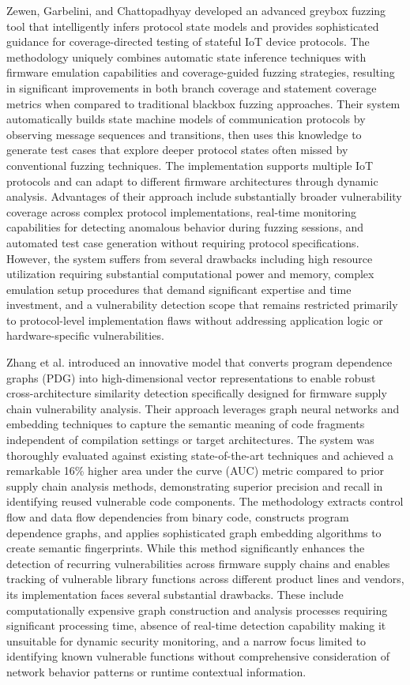 Zewen, Garbelini, and Chattopadhyay \cite{zewen2024ufuzz} developed an advanced greybox fuzzing tool that intelligently infers protocol state models and provides sophisticated guidance for coverage-directed testing of stateful IoT device protocols. The methodology uniquely combines automatic state inference techniques with firmware emulation capabilities and coverage-guided fuzzing strategies, resulting in significant improvements in both branch coverage and statement coverage metrics when compared to traditional blackbox fuzzing approaches. Their system automatically builds state machine models of communication protocols by observing message sequences and transitions, then uses this knowledge to generate test cases that explore deeper protocol states often missed by conventional fuzzing techniques. The implementation supports multiple IoT protocols and can adapt to different firmware architectures through dynamic analysis. Advantages of their approach include substantially broader vulnerability coverage across complex protocol implementations, real-time monitoring capabilities for detecting anomalous behavior during fuzzing sessions, and automated test case generation without requiring protocol specifications. However, the system suffers from several drawbacks including high resource utilization requiring substantial computational power and memory, complex emulation setup procedures that demand significant expertise and time investment, and a vulnerability detection scope that remains restricted primarily to protocol-level implementation flaws without addressing application logic or hardware-specific vulnerabilities.

Zhang et al. \cite{zhang2024pdg2vec} introduced an innovative model that converts program dependence graphs (PDG) into high-dimensional vector representations to enable robust cross-architecture similarity detection specifically designed for firmware supply chain vulnerability analysis. Their approach leverages graph neural networks and embedding techniques to capture the semantic meaning of code fragments independent of compilation settings or target architectures. The system was thoroughly evaluated against existing state-of-the-art techniques and achieved a remarkable 16\% higher area under the curve (AUC) metric compared to prior supply chain analysis methods, demonstrating superior precision and recall in identifying reused vulnerable code components. The methodology extracts control flow and data flow dependencies from binary code, constructs program dependence graphs, and applies sophisticated graph embedding algorithms to create semantic fingerprints. While this method significantly enhances the detection of recurring vulnerabilities across firmware supply chains and enables tracking of vulnerable library functions across different product lines and vendors, its implementation faces several substantial drawbacks. These include computationally expensive graph construction and analysis processes requiring significant processing time, absence of real-time detection capability making it unsuitable for dynamic security monitoring, and a narrow focus limited to identifying known vulnerable functions without comprehensive consideration of network behavior patterns or runtime contextual information.

